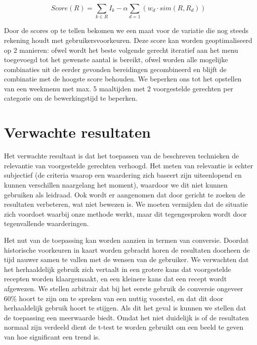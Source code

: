 \documentclass{hogent-article}
\begin{document}
\begin{equation}
    Score(R) = \sum_{k \in R}I_k - \alpha \sum_{d=1}(w_d \cdot sim(R,R_d))
\end{equation}

Door de scores op te tellen bekomen we een maat voor de variatie die nog steeds rekening houdt met gebruikersvoorkeuren. Deze score kan worden geoptimaliseerd op 2 manieren: ofwel wordt het beste volgende gerecht iteratief aan het menu toegevoegd tot het gewenste aantal is bereikt, ofwel worden alle mogelijke combinaties uit de eerder gevonden bereidingen gecombineerd en blijft de combinatie met de hoogste score behouden. We beperken ons tot het opstellen van een weekmenu met max. 5 maaltijden met 2 voorgestelde gerechten per categorie om de bewerkingstijd te beperken.

\section{Verwachte resultaten}%
\label{sec:verwachte-resultaten}


Het verwachte resultaat is dat het toepassen van de beschreven technieken de relevantie van voorgestelde gerechten verhoogd. Het meten van relevantie is echter subjectief (de criteria waarop een waardering zich baseert zijn uiteenlopend en kunnen verschillen naargelang het moment), waardoor we dit niet kunnen gebruiken als leidraad. Ook wordt er aangenomen dat door gericht te zoeken de resultaten verbeteren, wat niet bewezen is. We moeten vermijden dat de situatie zich voordoet waarbij onze methode werkt, maar dit tegengesproken wordt door tegenvallende waarderingen. 

Het nut van de toepassing kan worden aanzien in termen van conversie. Doordat historische voorkeuren in kaart worden gebracht horen de resultaten doorheen de tijd nauwer samen te vallen met de wensen van de gebruiker. We verwachten dat het herhaaldelijk gebruik zich vertaalt in een grotere kans dat voorgestelde recepten worden klaargemaakt, en een kleinere kans dat een recept wordt afgewezen. We stellen arbitrair dat bij het eerste gebruik de conversie ongeveer 60\% hoort te zijn om te spreken van een nuttig voorstel, en dat dit door herhaaldelijk gebruik hoort te stijgen. Als dit het geval is kunnen we stellen dat de toepassing een meerwaarde biedt. Omdat het niet duidelijk is of de resultaten normaal zijn verdeeld dient de t-test te worden gebruikt om een beeld te geven van hoe significant een trend is.
\end{document}
